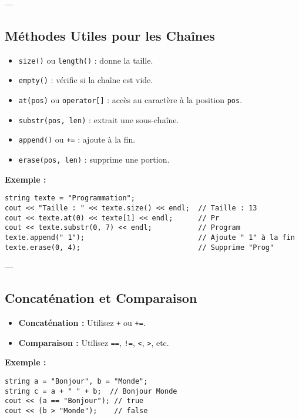 ---

\subsection{ Méthodes Utiles pour les Chaînes}
\begin{itemize}
    \item \texttt{size()} ou \texttt{length()} : donne la taille.
    \item \texttt{empty()} : vérifie si la chaîne est vide.
    \item \texttt{at(pos)} ou \texttt{operator[]} : accès au caractère à la position \texttt{pos}.
    \item \texttt{substr(pos, len)} : extrait une sous-chaîne.
    \item \texttt{append()} ou \texttt{+=} : ajoute à la fin.
    \item \texttt{erase(pos, len)} : supprime une portion.
\end{itemize}

\textbf{Exemple :}
\begin{tcolorbox}[colframe=blue!50!black, colback=blue!5!white, title=Exemple de Méthodes Utiles]
\begin{verbatim}
string texte = "Programmation";
cout << "Taille : " << texte.size() << endl;  // Taille : 13
cout << texte.at(0) << texte[1] << endl;      // Pr
cout << texte.substr(0, 7) << endl;           // Program
texte.append(" 1");                           // Ajoute " 1" à la fin
texte.erase(0, 4);                            // Supprime "Prog"
\end{verbatim}
\end{tcolorbox}

---

\subsection{ Concaténation et Comparaison}
\begin{itemize}
    \item \textbf{Concaténation :} Utilisez \texttt{+} ou \texttt{+=}.
    \item \textbf{Comparaison :} Utilisez \texttt{==}, \texttt{!=}, \texttt{<}, \texttt{>}, etc.
\end{itemize}

\textbf{Exemple :}
\begin{tcolorbox}[colframe=blue!50!black, colback=blue!5!white, title=Exemple de Concaténation et Comparaison]
\begin{verbatim}
string a = "Bonjour", b = "Monde";
string c = a + " " + b;  // Bonjour Monde
cout << (a == "Bonjour"); // true
cout << (b > "Monde");    // false
\end{verbatim}
\end{tcolorbox}

